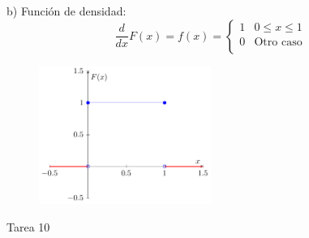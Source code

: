 \documentclass[a4paper, 12pt]{article}
\begin{document}
\begin{enumerate}
{                b) Función de densidad:
                \[
                    \frac{d}{dx}F(x) = f(x) =
                    \begin{cases}
                        1   &   0 \leq x \leq 1     \\
                        0   &   \text{Otro caso}    \\
                    \end{cases}
                \]
                \begin{figure}[H]
                    \centering
                    \includegraphics[width=0.5\textwidth]{Assets/Pdf/T9P3IB.pdf}
                \end{figure}
            }
    \end{enumerate}



    \newpage
    \vspace{0.3cm}

    \begin{center}
        { \LARGE Tarea 10}
    \end{center}
\end{document}
